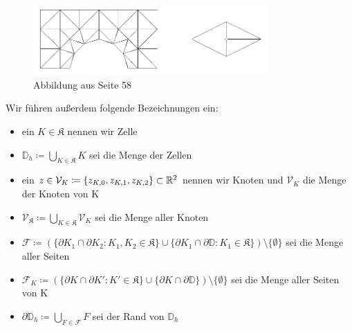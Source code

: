 \begin{figure}[H]
	\centering
	\includegraphics[width=0.8\textwidth]{triangulierung.png} \\
	Abbildung aus \cite{braess2013finite} Seite 58
\end{figure}
Wir führen außerdem folgende Bezeichnungen ein:
\begin{itemize}
	\item ein $ K \in \mathfrak{K} $ nennen wir Zelle
	\item $ \mathbb{D}_h \coloneqq \bigcup_{K \in \mathfrak{K}} K $ sei die Menge der Zellen
	\item ein $ z \in \mathcal{V}_K \coloneqq \{ z_{K,0} , z_{K,1} , z_{K,2}\} \subset \mathbb{R}^2 $ nennen wir Knoten und $\mathcal{V}_K$ die Menge der Knoten von K
	\item $ \mathcal{V}_{\mathfrak{K}} \coloneqq \bigcup_{K \in \mathfrak{K}} \mathcal{V}_K $ sei die Menge aller Knoten
	\item $\mathcal{F}  \coloneqq (\{ \partial K_1 \cap \partial K_2 : K_1,K_2 \in \mathfrak{K} \} \cup \{ \partial K_1 \cap \partial \mathbb{D} : K_1 \in \mathfrak{K} \}) \setminus \{\emptyset\} $ sei die Menge aller Seiten
	\item $ \mathcal{F}_K \coloneqq (\{ \partial K \cap \partial K' : K' \in \mathfrak{K} \} \cup \{ \partial K \cap \partial \mathbb{D} \}) \setminus \{ \emptyset \} $ sei die Menge aller Seiten von K 
	\item $ \partial \mathbb{D}_h \coloneqq \bigcup_{F \in \mathcal{F}} F $ sei der Rand von $ \mathbb{D}_h $
\end{itemize}

